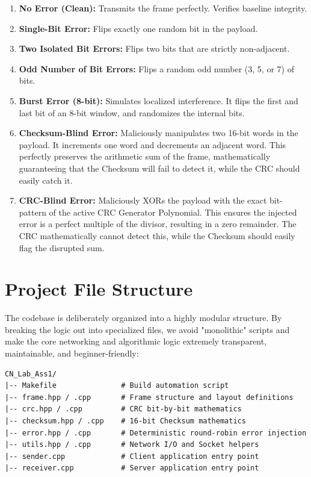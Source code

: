 \documentclass[12pt, a4paper]{article}
\begin{document}
\begin{enumerate}
    \item \textbf{No Error (Clean):} Transmits the frame perfectly. Verifies baseline integrity.
    \item \textbf{Single-Bit Error:} Flips exactly one random bit in the payload.
    \item \textbf{Two Isolated Bit Errors:} Flips two bits that are strictly non-adjacent.
    \item \textbf{Odd Number of Bit Errors:} Flips a random odd number (3, 5, or 7) of bits.
    \item \textbf{Burst Error (8-bit):} Simulates localized interference. It flips the first and last bit of an 8-bit window, and randomizes the internal bits.
    \item \textbf{Checksum-Blind Error:} Maliciously manipulates two 16-bit words in the payload. It increments one word and decrements an adjacent word. This perfectly preserves the arithmetic sum of the frame, mathematically guaranteeing that the Checksum will fail to detect it, while the CRC should easily catch it.
    \item \textbf{CRC-Blind Error:} Maliciously XORs the payload with the exact bit-pattern of the active CRC Generator Polynomial. This ensures the injected error is a perfect multiple of the divisor, resulting in a zero remainder. The CRC mathematically cannot detect this, while the Checksum should easily flag the disrupted sum.
\end{enumerate}

\section{Project File Structure}
The codebase is deliberately organized into a highly modular structure. By breaking the logic out into specialized files, we avoid "monolithic" scripts and make the core networking and algorithmic logic extremely transparent, maintainable, and beginner-friendly:

\begin{verbatim}
CN_Lab_Ass1/
|-- Makefile               # Build automation script
|-- frame.hpp / .cpp       # Frame structure and layout definitions
|-- crc.hpp / .cpp         # CRC bit-by-bit mathematics
|-- checksum.hpp / .cpp    # 16-bit Checksum mathematics
|-- error.hpp / .cpp       # Deterministic round-robin error injection
|-- utils.hpp / .cpp       # Network I/O and Socket helpers
|-- sender.cpp             # Client application entry point
|-- receiver.cpp           # Server application entry point
\end{verbatim}
\end{document}
